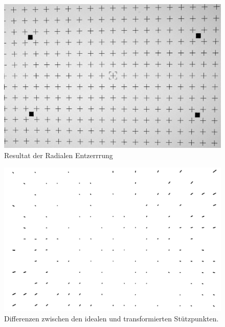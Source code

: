 \begin{figure}[H]
	\includegraphics[width=\textwidth]{Images/Auswertung/Testbild1/Radial.jpg}
	\caption{Resultat der Radialen Entzerrrung}
	\label{fig:Ergebnis}
\end{figure}

\begin{figure}[H]
	\includegraphics[width=\textwidth]{Images/Auswertung/Testbild1/Radial_onlydiffs.jpg}
	\caption{Differenzen zwischen den idealen und transformierten Stützpunkten.}
	\label{fig:diffsResult}
\end{figure}


